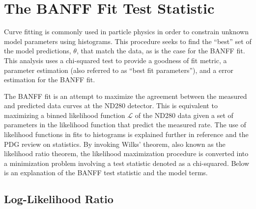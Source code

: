 \section{The BANFF Fit Test Statistic\label{sec:The-BANFF-Fit}}

Curve fitting is commonly used in particle physics in order to constrain
unknown model parameters using histograms. This procedure seeks to
find the ``best'' set of the model predictions, $\theta$, that
match the data, as is the case for the BANFF fit. This analysis uses
a chi-squared test to provide a goodness of fit metric, a parameter
estimation (also referred to as ``best fit parameters''), and a
error estimation for the BANFF fit.

The BANFF fit is an attempt to maximize the agreement between the
measured and predicted data curves at the ND280 detector. This is
equivalent to maximizing a binned likelihood function $\mathcal{L}$
of the ND280 data given a set of parameters in the likelihood function
that predict the measured rate. The use of likelihood functions in
fits to histograms is explained further in reference \cite{baker-cousins}
and the PDG review on statistics. By invoking Wilks' theorem, also
known as the likelihood ratio theorem, the likelihood maximization
procedure is converted into a minimization problem involving a test
statistic denoted as a chi-squared. Below is an explanation of the
BANFF test statistic and the model terms.

\subsection{Log-Likelihood Ratio}

